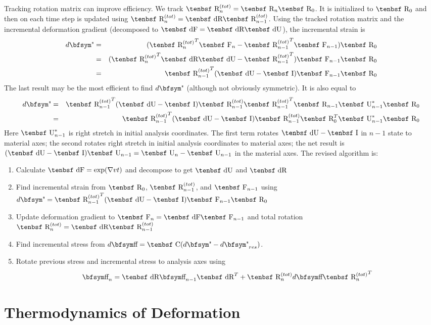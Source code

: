 \documentclass[11pt]{book}
\def\C{\hbox{\tenbsf C}}
\def\F{\hbox{\tenbsf F}}
\def\dF{\hbox{\tenbsf dF}}
\def\I{\hbox{\tenbsf I}}
\def\R{\hbox{\tenbsf R}}
\def\dR{\hbox{\tenbsf dR}}
\def\U{\hbox{\tenbsf U}}
\def\dU{\hbox{\tenbsf dU}}
\def\st{{\hbox{\bfsym\char'033}}}
\def\et{{\hbox{\bfsym\char'042}}}
\begin{document}
Tracking rotation matrix can improve efficiency. We track $\R^{(tot)}_n = \R_n\R_0$. It is initialized to $\R_0$ and then on each time step is updated using $\R^{(tot)}_n = \dR\R^{(tot)}_{n-1}$. Using the tracked rotation matrix and the incremental deformation gradient (decomposed to $\dF = \dR\dU$), the incremental strain is
\begin{eqnarray}
     d\et & = & ({\R^{(tot)}_n}^T\F_n - {\R^{(tot)}_{n-1}}^T\F_{n-1})\R_0 \\
     & = & ({\R^{(tot)}_n}^T\dR\dU - {\R^{(tot)}_{n-1}}^T)\F_{n-1}\R_0 \\
     & = & {\R^{(tot)}_{n-1}}^T(\dU - \I)\F_{n-1}\R_0
\end{eqnarray}
The last result may be the most efficient to find $d\et$ (although not obviously symmetric). It is also equal to
\begin{eqnarray}
     d\et & = & {\R^{(tot)}_{n-1}}^T(\dU - \I){\R^{(tot)}_{n-1}}{\R^{(tot)}_{n-1}}^T\R_{n-1}\U_{n-1}^*\R_0 \\
      & = & {\R^{(tot)}_{n-1}}^T(\dU - \I){\R^{(tot)}_{n-1}}\R_0^T\U_{n-1}^*\R_0
\end{eqnarray}
Here $\U_{n-1}^*$ is right stretch in initial analysis coordinates. The first term rotates $\dU-\I$ in $n-1$ state to material axes; the second rotates right stretch in initial analysis coordinates to material axes; the net result is $(\dU - \I)\U_{n-1} = \U_{n} - \U_{n-1}$ in the material axes. The revised algorithm is:
\begin{enumerate}
\item Calculate $\dF = \exp(\nabla v t)$ and decompose to get $\dU$ and $\dR$
\item Find incremental strain from $\R_0$, $\R^{(tot)}_{n-1}$, and $\F_{n-1}$ using $d\et={\R^{(tot)}_{n-1}}^T(\dU - \I)\F_{n-1}\R_0$
\item Update deformation gradient to $\F_n = \dF \F_{n-1}$ and total rotation $\R^{(tot)}_{n} = \dR\R^{(tot)}_{n-1}$
\item Find incremental stress from $d\st =  \C(d\et - d\et_{res})$.
\item Rotate previous stress and incremental stress to analysis axes using
\begin{equation}
   \st_n = \dR \st_{n-1}\dR^T + \R^{(tot)}_nd\st{\R^{(tot)}_n}^T
\end{equation}
\end{enumerate}


\chapter{Thermodynamics of Deformation}
\end{document}
